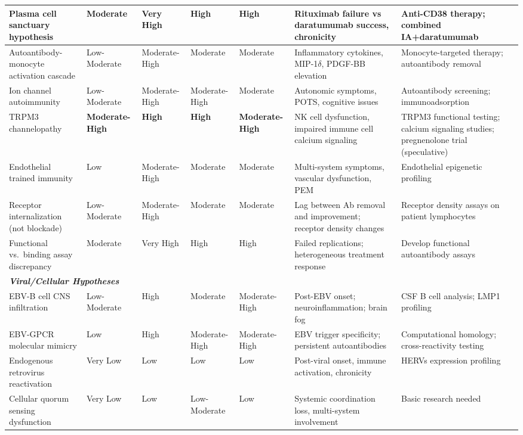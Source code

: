 \begin{landscape}
\begin{longtable}{p{3.5cm}p{2cm}p{2cm}p{1.8cm}p{1.8cm}p{4.5cm}p{5cm}}
\midrule
Plasma cell sanctuary hypothesis & Moderate & Very High & High & High & Rituximab failure vs daratumumab success, chronicity & Anti-CD38 therapy; combined IA+daratumumab \\
\midrule
Autoantibody-monocyte activation cascade & Low-Moderate & Moderate-High & Moderate & Moderate & Inflammatory cytokines, MIP-1$\delta$, PDGF-BB elevation & Monocyte-targeted therapy; autoantibody removal \\
\midrule
Ion channel autoimmunity & Low-Moderate & Moderate-High & Moderate-High & Moderate & Autonomic symptoms, POTS, cognitive issues & Autoantibody screening; immunoadsorption \\
\midrule
TRPM3 channelopathy & \textbf{Moderate-High} & \textbf{High} & \textbf{High} & \textbf{Moderate-High} & NK cell dysfunction, impaired immune cell calcium signaling & TRPM3 functional testing; calcium signaling studies; pregnenolone trial (speculative) \\
\midrule
Endothelial trained immunity & Low & Moderate-High & Moderate & Moderate & Multi-system symptoms, vascular dysfunction, PEM & Endothelial epigenetic profiling \\
\midrule
Receptor internalization (not blockade) & Low-Moderate & Moderate-High & Moderate & Moderate & Lag between Ab removal and improvement; receptor density changes & Receptor density assays on patient lymphocytes \\
\midrule
Functional vs.\ binding assay discrepancy & Moderate & Very High & High & High & Failed replications; heterogeneous treatment response & Develop functional autoantibody assays \\
\midrule
\multicolumn{7}{l}{\textit{\textbf{Viral/Cellular Hypotheses}}} \\
\midrule
EBV-B cell CNS infiltration & Low-Moderate & High & Moderate & Moderate-High & Post-EBV onset; neuroinflammation; brain fog & CSF B cell analysis; LMP1 profiling \\
\midrule
EBV-GPCR molecular mimicry & Low & High & Moderate-High & Moderate-High & EBV trigger specificity; persistent autoantibodies & Computational homology; cross-reactivity testing \\
\midrule
Endogenous retrovirus reactivation & Very Low & Low & Low & Low & Post-viral onset, immune activation, chronicity & HERVs expression profiling \\
\midrule
Cellular quorum sensing dysfunction & Very Low & Low & Low-Moderate & Low & Systemic coordination loss, multi-system involvement & Basic research needed \\

\end{longtable}
\end{landscape}
